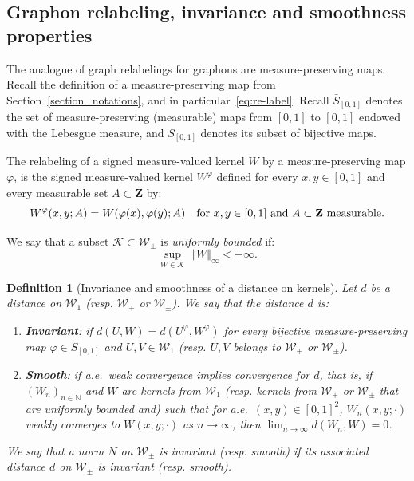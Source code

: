 \documentclass{amsart}
\newcommand{\aE}{a.e.\ }
\theoremstyle{plain}
\newtheorem{defin}[Th]{Definition}
\theoremstyle{definition}
\newcommand{\Space}{\mathbf{Z}}
\newcommand{\signed}{\pm}
\newcommand{\ck}{\mathcal{K}}
\newcommand{\Graphon}{\mathcal{W}_1}
\newcommand{\Kernel}{\mathcal{W}_{\signed}}
\newcommand{\Kernelp}{\mathcal{W}_{+}}
\newcommand{\TM}[1]{\norm{#1}_\infty}
\newcommand{\InvRelabel}{S_{[0,1]}}
\newcommand{\Relabel}{\bar{S}_{[0,1]}}
\newcommand{\N}{\mathbb{N}}
\newcommand{\norm}[1]{\Vert#1\Vert}
\begin{document}
\subsection{Graphon relabeling, invariance and smoothness properties}
	\label{subsection_graphon_relabeling}

The analogue  of graph  relabelings for graphons  are measure-preserving
maps.   Recall   the  definition   of  a  measure-preserving   map  from
Section~\ref{section_notations},        and         in        particular~\eqref{eq:re-label}.  
Recall $\Relabel$ denotes the set of measure-preserving (measurable)
maps from $[0, 1]$
to $[0, 1]$ endowed with the Lebesgue measure, 
and $\InvRelabel$ denotes its subset of bijective  maps.

The relabeling of a signed measure-valued kernel $W$ 
by a measure-preserving map $\varphi$,
is the signed measure-valued kernel $W^\varphi$ defined
for every $x,y\in [0,1]$ and every measurable set $A\subset \Space$
by:
\[
  W^\varphi(x,y;A) = W(\varphi(x),\varphi(y);A)
  \quad \text{for $x,y\in [0,1]$ and $ A\subset \Space$ measurable}.
\]

We say that a subset  $\ck\subset \Kernel$ is \emph{uniformly bounded} if:
\begin{equation}\label{eq_def_TM_graphon}
\sup_{W\in \ck}\,\, \TM{W}  < +\infty .
\end{equation}


\begin{defin}[Invariance and smoothness of a distance on kernels]
  \label{def:inv-smooth}
Let $d$ be a distance on $\Graphon$ (resp. $\Kernelp$ or $\Kernel$). 
We say that the distance $d$ is:
\begin{enumerate}[label=(\roman*)]
\item  \textbf{Invariant}:  if $d(U,W)=d(U^\varphi,W^\varphi)$  for  every 
bijective  measure-preserving map $\varphi  \in
 \InvRelabel$ and $U,V\in\Graphon$ 
  (resp. $U,V$ belongs to $\Kernelp$ or $\Kernel$).
  
\item \textbf{Smooth}: if \aE  weak convergence implies convergence for $d$,
  that is, if $(W_n)_{n\in\N}$  and $W$
  are  kernels  from $\Graphon$  (resp.  kernels from $\Kernelp$ or $\Kernel$ 
  that are  uniformly bounded and)  such that for \aE $(x,y)\in [0,1]^2$, $W_n(x,y;\cdot)$
  weakly  converges to  $W(x,y;\cdot)$  as $n\to\infty$,  then
  $\lim_{n\rightarrow\infty }d(W_n,W)= 0$.
\end{enumerate}
We say that a norm $N$ on $\Kernel$ is invariant (resp. smooth)
if its associated distance $d$ on $\Kernel$ is invariant (resp. smooth).
\end{defin}
\end{document}
